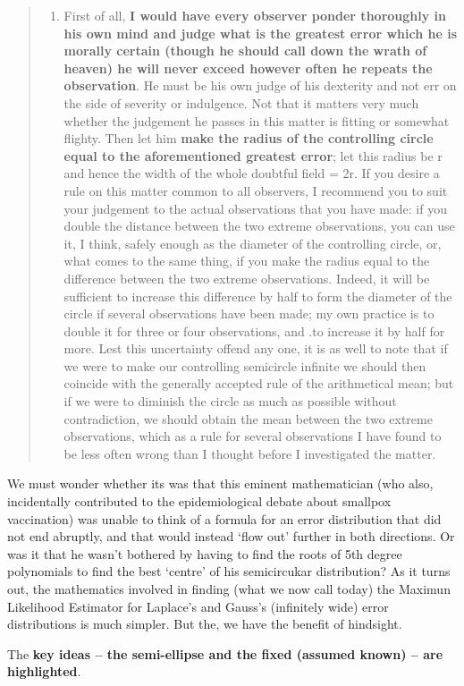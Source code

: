\documentclass[
]{article}
\providecommand{\tightlist}{%
  \setlength{\itemsep}{0pt}\setlength{\parskip}{0pt}}
\begin{document}
\begin{quote}
\begin{enumerate}
\def\labelenumi{\arabic{enumi}.}
\setcounter{enumi}{9}
\tightlist
\item
  First of all, \textbf{I would have every observer ponder thoroughly in
  his own mind and judge what is the greatest error which he is morally
  certain (though he should call down the wrath of heaven) he will never
  exceed however often he repeats the observation}. He must be his own
  judge of his dexterity and not err on the side of severity or
  indulgence. Not that it matters very much whether the judgement he
  passes in this matter is fitting or somewhat flighty. Then let him
  \textbf{make the radius of the controlling circle equal to the
  aforementioned greatest error}; let this radius be r and hence the
  width of the whole doubtful field = 2r. If you desire a rule on this
  matter common to all observers, I recommend you to suit your judgement
  to the actual observations that you have made: if you double the
  distance between the two extreme observations, you can use it, I
  think, safely enough as the diameter of the controlling circle, or,
  what comes to the same thing, if you make the radius equal to the
  difference between the two extreme observations. Indeed, it will be
  sufficient to increase this difference by half to form the diameter of
  the circle if several observations have been made; my own practice is
  to double it for three or four observations, and .to increase it by
  half for more. Lest this uncertainty offend any one, it is as well to
  note that if we were to make our controlling semicircle infinite we
  should then coincide with the generally accepted rule of the
  arithmetical mean; but if we were to diminish the circle as much as
  possible without contradiction, we should obtain the mean between the
  two extreme observations, which as a rule for several observations I
  have found to be less often wrong than I thought before I investigated
  the matter.
\end{enumerate}
\end{quote}

We must wonder whether its was that this eminent mathematician (who
also, incidentally contributed to the epidemiological debate about
smallpox vaccination) was unable to think of a formula for an error
distribution that did not end abruptly, and that would instead `flow
out' further in both directions. Or was it that he wasn't bothered by
having to find the roots of 5th degree polynomials to find the best
`centre' of his semicircukar distribution? As it turns out, the
mathematics involved in finding (what we now call today) the Maximun
Likelihood Estimator for Laplace's and Gauss's (infinitely wide) error
distributions is much simpler. But the, we have the benefit of
hindsight.

The \textbf{key ideas -- the semi-ellipse and the fixed (assumed known)
-- are highlighted}.
\end{document}
